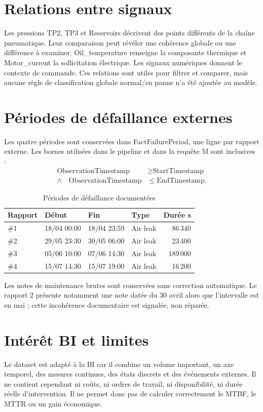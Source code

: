 \section{Relations entre signaux}
Les pressions TP2, TP3 et Reservoirs décrivent des points différents de la chaîne pneumatique. Leur comparaison peut révéler une cohérence globale ou une différence à examiner. Oil\_temperature renseigne la composante thermique et Motor\_current la sollicitation électrique. Les signaux numériques donnent le contexte de commande. Ces relations sont utiles pour filtrer et comparer, mais aucune règle de classification globale normal/en panne n'a été ajoutée au modèle.

\section{Périodes de défaillance externes}
Les quatre périodes sont conservées dans FactFailurePeriod, une ligne par rapport externe. Les bornes utilisées dans le pipeline et dans la requête M sont inclusives :
\[
\begin{aligned}
\text{ObservationTimestamp} &\geq \text{StartTimestamp}\\
\land\quad \text{ObservationTimestamp} &\leq \text{EndTimestamp}.
\end{aligned}
\]
\begin{table}[H]
\centering
\caption{Périodes de défaillance documentées}
\label{tab:failures}
\begin{tabularx}{\textwidth}{l l l l r}
\toprule
\textbf{Rapport} & \textbf{Début} & \textbf{Fin} & \textbf{Type} & \textbf{Durée s}\\
\midrule
\#1 & 18/04 00:00 & 18/04 23:59 & Air leak & 86\,340\\
\#2 & 29/05 23:30 & 30/05 06:00 & Air leak & 23\,400\\
\#3 & 05/06 10:00 & 07/06 14:30 & Air leak & 189\,000\\
\#4 & 15/07 14:30 & 15/07 19:00 & Air leak & 16\,200\\
\bottomrule
\end{tabularx}
\end{table}
Les notes de maintenance brutes sont conservées sans correction automatique. Le rapport 2 présente notamment une note datée du 30 avril alors que l'intervalle est en mai ; cette incohérence documentaire est signalée, non réparée.

\section{Intérêt BI et limites}
Le dataset est adapté à la BI car il combine un volume important, un axe temporel, des mesures continues, des états discrets et des événements externes. Il ne contient cependant ni coûts, ni ordres de travail, ni disponibilité, ni durée réelle d'intervention. Il ne permet donc pas de calculer correctement le MTBF, le MTTR ou un gain économique.
